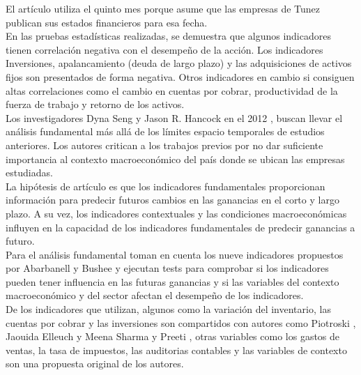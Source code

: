 El artículo utiliza el quinto mes porque asume que las empresas de Tunez publican sus estados financieros para esa fecha.\\
 
En las pruebas estadísticas realizadas, se demuestra que algunos indicadores tienen correlación negativa con el desempeño de la acción. Los indicadores Inversiones, apalancamiento (deuda de largo plazo) y las adquisiciones de activos fijos son presentados de forma negativa. Otros indicadores en cambio si consiguen altas correlaciones como el cambio en cuentas por cobrar, productividad de la fuerza de trabajo y retorno de los activos.\\



Los investigadores Dyna Seng y Jason R. Hancock en el 2012 \cite{DynaSeng2012}, buscan llevar el análisis fundamental más allá de los límites espacio temporales de estudios anteriores. Los autores critican a los trabajos previos por no dar suficiente importancia al contexto macroeconómico del país donde se ubican las empresas estudiadas.\\

La hipótesis de art\'iculo es que los indicadores fundamentales proporcionan información para predecir futuros cambios en las ganancias en el corto y largo plazo. A su vez, los indicadores contextuales y las condiciones macroeconómicas influyen en la capacidad de los indicadores fundamentales de predecir ganancias a futuro.\\

Para el an\'alisis fundamental toman en cuenta los nueve indicadores propuestos por Abarbanell y Bushee \cite{Abarbanell1998} y ejecutan tests para comprobar si los indicadores pueden tener influencia en las futuras ganancias y si las variables del contexto macroeconómico y del sector afectan el desempeño de los indicadores.\\

De los indicadores que utilizan, algunos como la variaci\'on del inventario, las cuentas por cobrar y las inversiones son compartidos con autores como Piotroski \cite{Piotroski2000}, Jaouida Elleuch \cite{Elleuch2009} y Meena Sharma y Preeti \cite{Preeti2009}, otras variables como los gastos de ventas, la tasa de impuestos, las auditorias contables y las variables de contexto son una propuesta original de los autores.\\

